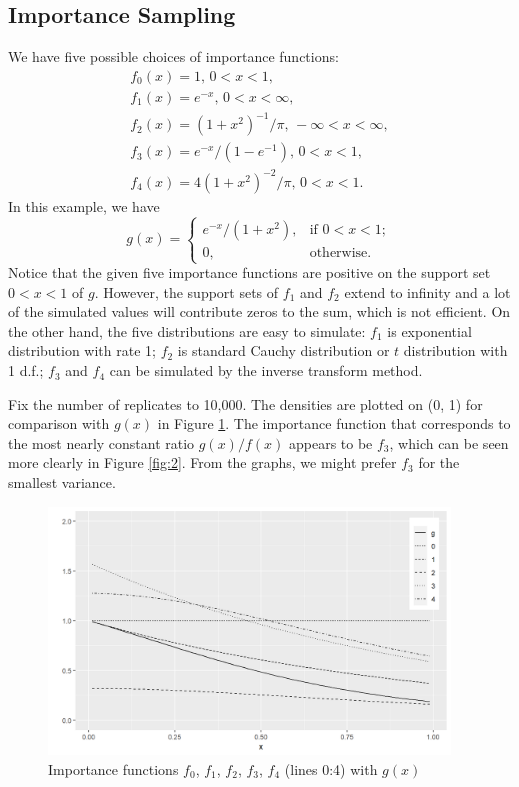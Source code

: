 \documentclass[11pt]{article}
\begin{document}
\subsection{Importance Sampling}
We have five possible choices of importance functions:
\begin{gather*}
f_0(x)=1,\, 0<x<1,\\
f_1(x)=e^{-x},\, 0<x<\infty,\\
f_2(x)=(1+x^2)^{-1}/\pi,\, -\infty<x<\infty,\\
f_3(x)=e^{-x}/(1-e^{-1}),\, 0<x<1,\\
f_4(x)=4(1+x^2)^{-2}/\pi,\, 0<x<1.
\end{gather*}
In this example, we have
\[
g(x)=
\begin{cases}
e^{-x}/(1+x^2), & \text{if } 0<x<1;\\
0, & \text{otherwise}.
\end{cases}
\]
Notice that the given five importance functions are positive on the support set $0<x<1$ of $g$. However, the support sets of $f_1$ and $f_2$ extend to infinity and a lot of the simulated values will contribute zeros to the sum, which is not efficient. On the other hand, the five distributions are easy to simulate: $f_1$ is exponential distribution with rate 1; $f_2$ is standard Cauchy distribution or $t$ distribution with 1 d.f.; $f_3$ and $f_4$ can be simulated by the inverse transform method.

Fix the number of replicates to 10,000. The densities are plotted on (0, 1) for comparison with $g(x)$ in Figure \ref{fig:1}. The importance function that corresponds to the most nearly constant ratio $g(x)/f(x)$ appears to be $f_3$, which can be seen more clearly in Figure \ref{fig:2}. From the graphs, we might prefer $f_3$ for the smallest variance.

\begin{figure}[h!]
\includegraphics[width=0.95\textwidth]{1}
\centering
\caption{Importance functions $f_0$, $f_1$, $f_2$, $f_3$, $f_4$ (lines 0:4) with $g(x)$}\label{fig:1}
\end{figure}
\end{document}
